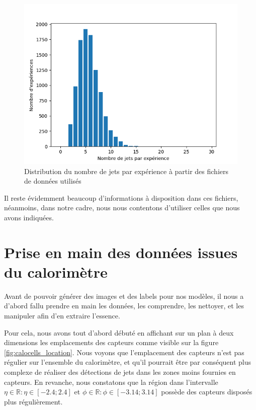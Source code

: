 \begin{figure}[hbt!]
    \centering
    \includegraphics[scale=0.7]{Figures/dataset/file_jet_distribution.png}
    \caption{Distribution du nombre de jets par expérience à partir des fichiers de données utilisés}
    \label{fig:jet_distribution}
\end{figure}

Il reste évidemment beaucoup d'informations à disposition dans ces fichiers, néanmoins, dans notre cadre, nous nous contentons d'utiliser celles que nous avons indiquées.

\section{Prise en main des données issues du calorimètre}

Avant de pouvoir générer des images et des labels pour nos modèles, il nous a d'abord fallu prendre en main les données, les comprendre, les nettoyer, et les manipuler afin d'en extraire l'essence.

Pour cela, nous avons tout d'abord débuté en affichant sur un plan à deux dimensions les emplacements des capteurs comme visible sur la figure \ref{fig:calocells_location}. Nous voyons que l'emplacement des capteurs n'est pas régulier sur l'ensemble du calorimètre, et qu'il pourrait être par conséquent plus complexe de réaliser des détections de jets dans les zones moins fournies en capteurs. En revanche, nous constatons que la région dans l'intervalle $\eta \in \mathbb{R} : \eta \in [-2.4;2.4]$ et $\phi \in \mathbb{R} : \phi \in [-3.14;3.14]$ possède des capteurs disposés plus régulièrement.

